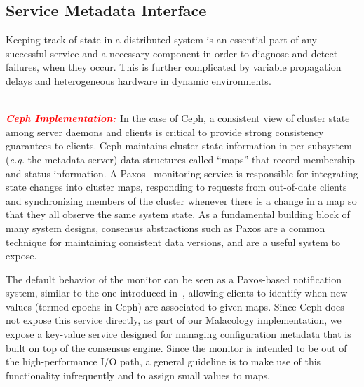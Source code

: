 \documentclass[preprint]{sigplanconf-eurosys}
\newcommand{\newcomment}[1]{{\textcolor{red}{\textbf{#1}}}}
\begin{document}
\subsection{Service Metadata Interface}
\label{sec:mon}
\label{sec:service-metadata-interface}
\label{service-metadata}

Keeping track of state in a distributed system is an essential part of any
successful service and a necessary component in order to diagnose and detect
failures, when they occur. This is further complicated by variable propagation
delays and heterogeneous hardware in dynamic environments.

\newcomment{\\ \noindent\it{\textbf{Ceph Implementation: }}}
In the case of Ceph, a consistent view of cluster state among server daemons
and clients is critical to provide strong consistency guarantees to clients.
Ceph maintains cluster state information in per-subsystem ({\it e.g.} the
metadata server) data structures called ``maps'' that record membership and
status information.  A Paxos~\cite{lamport_parttime_1998} monitoring service is
responsible for integrating state changes into cluster maps, responding to
requests from out-of-date clients and synchronizing members of the cluster
whenever there is a change in a map so that they all observe the same system
state. As a fundamental building block of many system designs, consensus
abstractions such as Paxos are a common technique for maintaining consistent
data versions, and are a useful system to expose.

The default behavior of the monitor can be seen as a Paxos-based notification
system, similar to the one introduced in~\cite{burrows_chubby_2006}, allowing
clients to identify when new values (termed epochs in Ceph) are associated to
given maps.  Since Ceph does not expose this service directly, as part of our Malacology implementation, we expose a key-value
service designed for managing configuration metadata that is built on top of
the consensus engine. Since the monitor is intended to be out of the
high-performance I/O path, a general guideline is to make use of this
functionality infrequently and to assign small values to maps.\\
\end{document}
